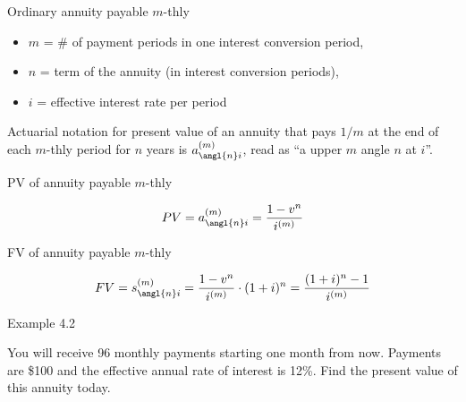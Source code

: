 \documentclass{beamer}
\begin{document}
\begin{frame}{Ordinary annuity payable $m$-thly}

\begin{itemize}
\item[] $m$ = \# of payment periods in one interest conversion period,
\item[] $n$ = term of the annuity (in interest conversion periods),
\item[] $i$ = effective interest rate per period
\end{itemize}

\bigskip
Actuarial notation for present value of an annuity that pays $1/m$ at the end of each $m$-thly period for $n$ years is $a_{\angl{n}i}^{(m)}$, read as ``a upper $m$ angle $n$ at $i$''.

\end{frame}

\begin{frame}{PV of annuity payable $m$-thly}

\begin{center}
\end{center}

\[
PV = a_{\angl{n}i}^{(m)} = \frac{1-v^n}{i^{(m)}}
\]

\vfill
\end{frame}

\begin{frame}{FV of annuity payable $m$-thly}

\begin{center}
\end{center}

\[
FV = s_{\angl{n}i}^{(m)} = \frac{1-v^n}{i^{(m)}} \cdot (1+i)^n = \frac{(1+i)^n - 1}{i^{(m)}}
\]

\vfill
\end{frame}

\begin{frame}{Example 4.2}

You will receive 96 monthly payments starting one month from now. Payments are \$100 and the effective annual rate of interest is 12\%. Find the present value of this annuity today.

\bigskip
\begin{center}
\end{center}

\vfill
\end{frame}
\end{document}
